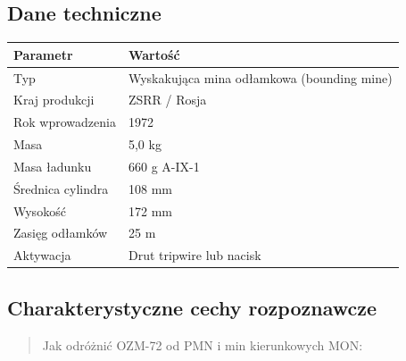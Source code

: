 \documentclass[12pt,oneside]{book}
\begin{document}
\subsection{Dane techniczne}\label{dane-techniczne-124}

\begin{longtable}[]{@{}ll@{}}
\toprule\noalign{}
Parametr & Wartość \\
\midrule\noalign{}
\endhead
\bottomrule\noalign{}
\endlastfoot
Typ & Wyskakująca mina odłamkowa (bounding mine) \\
Kraj produkcji & ZSRR / Rosja \\
Rok wprowadzenia & 1972 \\
Masa & 5,0 kg \\
Masa ładunku & 660 g A-IX-1 \\
Średnica cylindra & 108 mm \\
Wysokość & 172 mm \\
Zasięg odłamków & 25 m \\
Aktywacja & Drut tripwire lub nacisk \\
\end{longtable}

\subsection{Charakterystyczne cechy
rozpoznawcze}\label{charakterystyczne-cechy-rozpoznawcze-124}

\begin{quote}
Jak odróżnić OZM-72 od PMN i min kierunkowych MON:
\end{quote}
\end{document}

